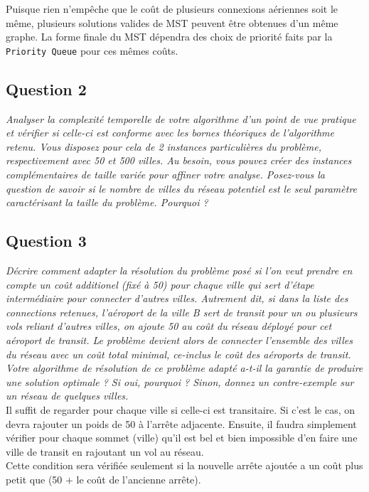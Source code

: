 \documentclass[11pt]{article}
\begin{document}
Puisque rien n'empêche que le coût de plusieurs connexions aériennes soit le même, plusieurs solutions valides de MST peuvent être obtenues d'un même graphe. La forme finale du MST dépendra des choix de priorité faits par la \verb+Priority Queue+ pour ces mêmes coûts.

\subsection*{Question 2}
\textit{Analyser la complexité temporelle de votre algorithme d’un point de vue pratique et vérifier si celle-ci est conforme avec les bornes théoriques de l’algorithme retenu. Vous disposez pour cela de 2 instances particulières du problème, respectivement avec 50 et 500 villes. Au besoin, vous pouvez créer des instances complémentaires de taille variée pour affiner votre analyse. Posez-vous la question de savoir si le nombre de villes du réseau potentiel est le seul paramètre caractérisant la taille du problème. Pourquoi ?} \\



\subsection*{Question 3}
\textit{Décrire comment adapter la résolution du problème posé si l’on veut prendre en compte un coût additionel (fixé à 50) pour chaque ville qui sert d’étape intermédiaire pour connecter d’autres villes. Autrement dit, si dans la liste des connections retenues, l’aéroport de la ville B sert de transit pour un ou plusieurs vols reliant d’autres villes, on ajoute 50 au coût du réseau déployé pour cet aéroport de transit. Le problème devient alors de connecter l’ensemble des villes du réseau avec un coût total minimal, ce-inclus le coût des aéroports de transit. Votre algorithme de résolution de ce problème adapté a-t-il la garantie de produire une solution optimale ? Si oui, pourquoi ? Sinon, donnez un contre-exemple sur un réseau de quelques villes.} \\ 

Il suffit de regarder pour chaque ville si celle-ci est transitaire. Si c'est le cas, on devra rajouter un poids de 50 à l'arrête adjacente. Ensuite, il faudra simplement vérifier pour chaque sommet (ville) qu'il est bel et bien impossible d'en faire une ville de transit en rajoutant un vol au réseau. \\
Cette condition sera vérifiée seulement si la nouvelle arrête ajoutée a un coût plus petit que (50 $+$ le coût de l'ancienne arrête).
\end{document}
